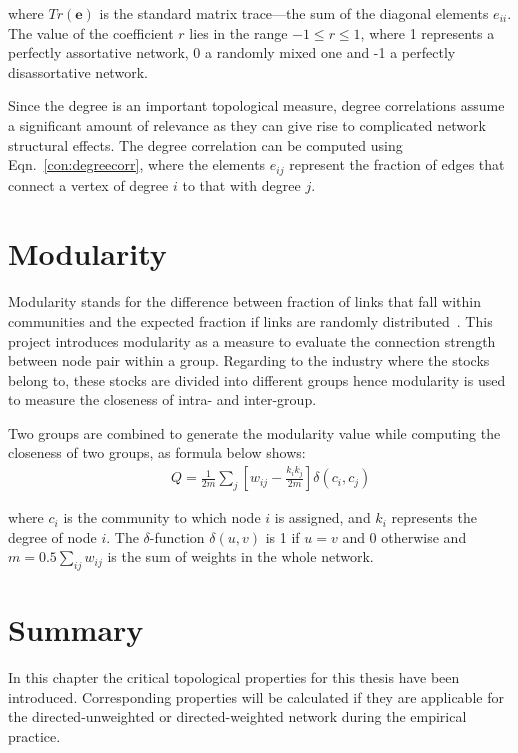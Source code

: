 where $Tr(\mathbf{e})$ is the standard matrix trace—the sum of the diagonal elements $e_{ii}$. The value of the coefficient $r$ lies in the range $-1\leq{r}\leq{1}$, where 1 represents a perfectly assortative network, 0 a randomly mixed one and -1 a perfectly disassortative network.

Since the degree is an important topological measure, degree correlations assume a significant amount of relevance as they can give rise to complicated network structural effects. The degree correlation can be computed using Eqn.~\ref{con:degreecorr}, where the elements $e_{ij}$ represent the fraction of edges that connect a vertex of degree $i$ to that with degree $j$.

\section{Modularity}
Modularity stands for the difference between fraction of links that fall within communities and the expected fraction if links are randomly distributed~\cite{newman2004finding}. This project introduces modularity as a measure to evaluate the connection strength between node pair within a group. Regarding to the industry where the stocks belong to, these stocks are divided into different groups hence modularity is used to measure the closeness of intra- and inter-group.

Two groups are combined to generate the modularity value while computing the closeness of two groups, as formula below shows:
\begin{eqnarray}
&&Q=\frac{1}{2m}\sum_{j}\left[w_{ij}-\frac{k_ik_j}{2m}\right]\delta\left(c_i,c_j\right)
\end{eqnarray}

where $c_i$ is the community to which node $i$ is assigned, and $k_i$ represents the degree of node $i$. The $\delta$-function $\delta(u,v)$ is 1 if $u=v$ and 0 otherwise and $m=0.5\sum_{ij}w_{ij}$ is the sum of weights in the whole network.

\section{Summary}
In this chapter the critical topological properties for this thesis have been introduced. Corresponding properties will be calculated if they are applicable for the directed-unweighted or directed-weighted network during the empirical practice.
